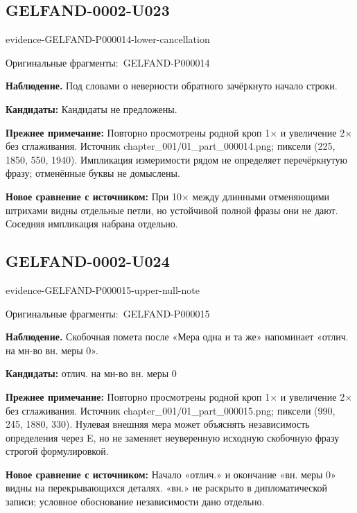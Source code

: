 \documentclass[11pt]{article}
\newcommand{\EvidenceBlock}[4]{%
 \par\smallskip\noindent\begin{minipage}{\linewidth}
 \begin{minipage}[t]{.47\linewidth}\vspace{0pt}\centering
 \csname evidence-#1-#2\endcsname\par
 {\scriptsize\SourceCropCaption\ #1}\par
 \end{minipage}\hfill
 \begin{minipage}[t]{.49\linewidth}\vspace{0pt}\raggedright
 {\small\color{orange!65!black}\textbf{#4} #3}\par
 \end{minipage}
 \end{minipage}\par\smallskip}
\newcommand{\SourceCropCaption}{Оригинальные фрагменты:}\newcommand{\ReadingCaption}{Сомнительное чтение.}\newcommand{\IncompleteCaption}{Неразобранный фрагмент.}\newcommand{\DiagramCaption}{Рисунок и набранное описание.}
\begin{document}
\subsection*{GELFAND-0002-U023}
\EvidenceBlock{GELFAND-P000014}{lower-cancellation}{Под словами о неверности обратного зачёркнуто начало строки.}{Наблюдение.}
\par\smallskip\noindent\textbf{Кандидаты: } Кандидаты не предложены.\par
\par\smallskip\noindent\textbf{Прежнее примечание: } Повторно просмотрены родной кроп 1× и увеличение 2× без сглаживания. Источник chapter\_001/01\_part\_000014.png; пиксели (225, 1850, 550, 1940). Импликация измеримости рядом не определяет перечёркнутую фразу; отменённые буквы не домыслены.\par
\par\smallskip\noindent\textbf{Новое сравнение с источником: } При 10× между длинными отменяющими штрихами видны отдельные петли, но устойчивой полной фразы они не дают. Соседняя импликация набрана отдельно.\par

\subsection*{GELFAND-0002-U024}
\EvidenceBlock{GELFAND-P000015}{upper-null-note}{Скобочная помета после «Мера одна и та же» напоминает «отлич. на мн-во вн. меры 0».}{Наблюдение.}
\par\smallskip\noindent\textbf{Кандидаты: } отлич. на мн-во вн. меры 0\par
\par\smallskip\noindent\textbf{Прежнее примечание: } Повторно просмотрены родной кроп 1× и увеличение 2× без сглаживания. Источник chapter\_001/01\_part\_000015.png; пиксели (990, 245, 1880, 330). Нулевая внешняя мера может объяснять независимость определения через E, но не заменяет неуверенную исходную скобочную фразу строгой формулировкой.\par
\par\smallskip\noindent\textbf{Новое сравнение с источником: } Начало «отлич.» и окончание «вн. меры 0» видны на перекрывающихся деталях. «вн.» не раскрыто в дипломатической записи; условное обоснование независимости дано отдельно.\par
\end{document}
